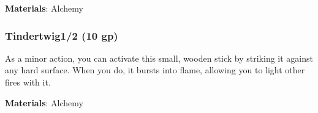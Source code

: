 \vspace{0.25em}
\textbf{Materials}: Alchemy


\lowercase{\hypertarget{item:Tindertwig}{}}\label{item:Tindertwig}
\hypertarget{item:Tindertwig}{\subsubsection{Tindertwig\hfill1/2 (10 gp)}}

As a minor action, you can activate this small, wooden stick by striking it against any hard surface.
When you do, it bursts into flame, allowing you to light other fires with it.



\vspace{0.25em}
\textbf{Materials}: Alchemy
